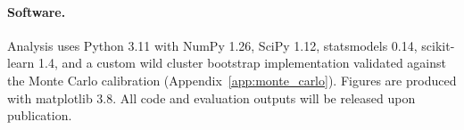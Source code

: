 \paragraph{Software.} Analysis uses Python 3.11 with NumPy 1.26, SciPy 1.12, statsmodels 0.14, scikit-learn 1.4, and a custom wild cluster bootstrap implementation validated against the Monte Carlo calibration (Appendix~\ref{app:monte_carlo}). Figures are produced with matplotlib 3.8. All code and evaluation outputs will be released upon publication.
